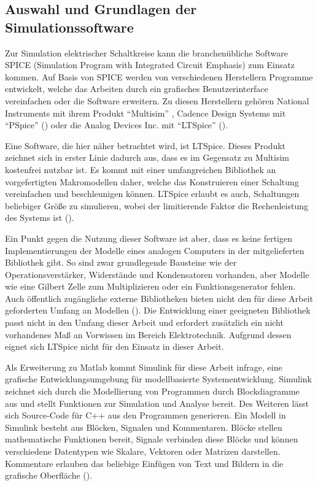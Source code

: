 \subsection{Auswahl und Grundlagen der Simulationssoftware}
\label{chap:Auswahl und Grundlagen der Simulationssoftware}

Zur Simulation elektrischer Schaltkreise kann die branchenübliche Software SPICE (Simulation Program with Integrated Circuit Emphasis) zum Einsatz kommen. Auf Basis von SPICE werden von verschiedenen Herstellern Programme entwickelt, welche das Arbeiten durch \zbol ein grafisches Benutzerinterface vereinfachen oder die Software erweitern. Zu diesen Herstellern gehören \ua National Instruments mit ihrem Produkt "`Multisim"' \cite{NIMultisim}, Cadence Design Systems mit "`PSpice"' (\cite{CadencePSpice}) oder die Analog Devices Inc. mit "`LTSpice"' (\cite{AnalogDevicesLTSpice}).

Eine Software, die hier näher betrachtet wird, ist LTSpice. Dieses Produkt zeichnet sich in erster Linie dadurch aus, dass es im Gegensatz zu \zbol Multisim kostenfrei nutzbar ist. Es kommt mit einer umfangreichen Bibliothek an vorgefertigten Makromodellen daher, welche das Konstruieren einer Schaltung vereinfachen und beschleunigen können. LTSpice erlaubt es auch, Schaltungen beliebiger Größe zu simulieren, wobei der limitierende Faktor die Rechenleistung des Systems ist (\cite{Alonso2019}).

Ein Punkt gegen die Nutzung dieser Software ist aber, dass es keine fertigen Implementierungen der Modelle eines analogen Computers in der mitgelieferten Bibliothek gibt. So sind zwar grundlegende Bausteine wie der Operationsverstärker, Widerstände und Kondensatoren vorhanden, aber Modelle wie eine Gilbert Zelle zum Multiplizieren oder ein Funktionsgenerator fehlen. Auch öffentlich zugängliche externe Bibliotheken bieten nicht den für diese Arbeit geforderten Umfang an Modellen (\cite[vgl.]{MaffeiLTSpiceAnalogComputer}). Die Entwicklung einer geeigneten Bibliothek passt nicht in den Umfang dieser Arbeit und erfordert zusätzlich ein nicht vorhandenes Maß an Vorwissen im Bereich Elektrotechnik. Aufgrund dessen eignet sich LTSpice nicht für den Einsatz in dieser Arbeit.

Als Erweiterung zu Matlab kommt Simulink für diese Arbeit infrage, eine grafische Entwicklungsumgebung für modellbasierte Systementwicklung. Simulink zeichnet sich durch die Modellierung von Programmen durch Blockdiagramme aus und stellt Funktionen zur Simulation und Analyse bereit. Des Weiteren lässt sich Source-Code für \zb C++ aus den Programmen generieren. Ein Modell in Simulink besteht aus Blöcken, Signalen und Kommentaren. Blöcke stellen mathematische Funktionen bereit, Signale verbinden diese Blöcke und können verschiedene Datentypen wie Skalare, Vektoren oder Matrizen darstellen. Kommentare erlauben das beliebige Einfügen von Text und Bildern in die grafische Oberfläche (\cite{Peasley2018}).

